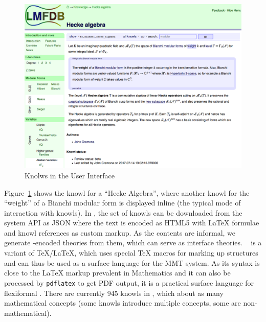 \begin{figure}[ht]\centering
  \includegraphics[width=14cm]{knowl}
  \caption{Knolws in the \LMFDB User Interface}\label{fig:knowl}
\end{figure}

Figure~\ref{fig:knowl} shows the knowl for a ``Hecke Algebra'', where another knowl for the ``weight'' of a Bianchi modular form is displayed inline (the typical mode of interaction with knowls).
In \LMFDB, the set of knowls can be downloaded from the system API as JSON where the
text is encoded as HTML5 with {\LaTeX} formulae and knowl references as custom markup. As the
contents are informal, we generate \sTeX-encoded \ommt theories from them, which can serve as interface theories.
\sTeX~\cite{Kohlhase:ulsmf08,sTeX:github:on} is a variant of {\TeX/\LaTeX}, which uses special {\TeX} macros for marking up \ommt structures and can thus be used as a surface language for the MMT system.
As its syntax is close to the {\LaTeX} markup prevalent in Mathematics and it can also be processed by \texttt{pdflatex} to get PDF output, it is a practical surface language for flexiformal \ommt.
There are currently 945 knowls in \LMFDB, which about as many mathematical concepts (some knowls introduce multiple concepts, some are non-mathematical). 





